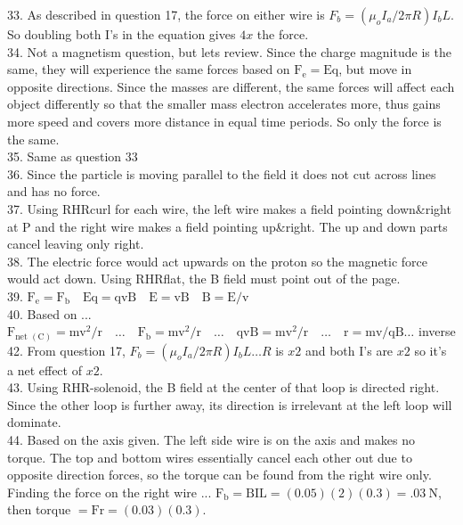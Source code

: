 \begin{enumerate}
33. As described in question 17, the force on either wire is $F_{b}=\left(\mu_{o} I_{a} / 2 \pi R\right) I_{b} L$. So doubling both I's in the equation gives $4 x$ the force.\\
34. Not a magnetism question, but lets review. Since the charge magnitude is the same, they will experience the same forces based on $\mathrm{F}_{\mathrm{e}}=\mathrm{Eq}$, but move in opposite directions. Since the masses are different, the same forces will affect each object differently so that the smaller mass electron accelerates more, thus gains more speed and covers more distance in equal time periods. So only the force is the same.\\
35. Same as question 33\\
36. Since the particle is moving parallel to the field it does not cut across lines and has no force.\\
37. Using RHRcurl for each wire, the left wire makes a field pointing down\&right at P and the right wire makes a field pointing up\&right. The up and down parts cancel leaving only right.\\
38. The electric force would act upwards on the proton so the magnetic force would act down. Using RHRflat, the B field must point out of the page.\\
39. $\mathrm{F}_{\mathrm{e}}=\mathrm{F}_{\mathrm{b}} \quad \mathrm{Eq}=\mathrm{qvB} \quad \mathrm{E}=\mathrm{vB} \quad \mathrm{B}=\mathrm{E} / \mathrm{v}$\\
40. Based on ... $\mathrm{F}_{\text {net }(\mathrm{C})}=\mathrm{mv}^{2} / \mathrm{r} \quad \ldots \quad \mathrm{F}_{\mathrm{b}}=\mathrm{mv}^{2} / \mathrm{r} \quad \ldots \quad \mathrm{qvB}=\mathrm{mv}^{2} / \mathrm{r} \quad \ldots \quad \mathrm{r}=\mathrm{mv} / \mathrm{qB} \ldots$ inverse\\
42. From question 17, $F_{b}=\left(\mu_{o} I_{a} / 2 \pi R\right) I_{b} L \ldots R$ is $x 2$ and both I's are $x 2$ so it's a net effect of $x 2$.\\
43. Using RHR-solenoid, the B field at the center of that loop is directed right. Since the other loop is further away, its direction is irrelevant at the left loop will dominate.\\
44. Based on the axis given. The left side wire is on the axis and makes no torque. The top and bottom wires essentially cancel each other out due to opposite direction forces, so the torque can be found from the right wire only. Finding the force on the right wire ... $\mathrm{F}_{\mathrm{b}}=\mathrm{BIL}=(0.05)(2)(0.3)=.03 \mathrm{~N}$, then torque $=\mathrm{Fr}=(0.03)(0.3)$.\\

\end{enumerate}
